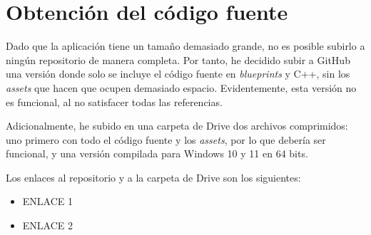 \chapter{Obtención del código fuente}

Dado que la aplicación tiene un tamaño demasiado grande, no es posible subirlo a ningún repositorio de manera completa. Por tanto, he decidido subir a GitHub una versión donde solo se incluye el código fuente en \textit{blueprints} y C++, sin los \textit{assets} que hacen que ocupen demasiado espacio. Evidentemente, esta versión no es funcional, al no satisfacer todas las referencias.

\bigskip

Adicionalmente, he subido en una carpeta de Drive dos archivos comprimidos: uno primero con todo el código fuente y los \textit{assets}, por lo que debería ser funcional, y una versión compilada para Windows 10 y 11 en 64 bits.

\bigskip

Los enlaces al repositorio y a la carpeta de Drive son los siguientes:

\begin{itemize}
    \item ENLACE 1
    \item ENLACE 2
\end{itemize}
